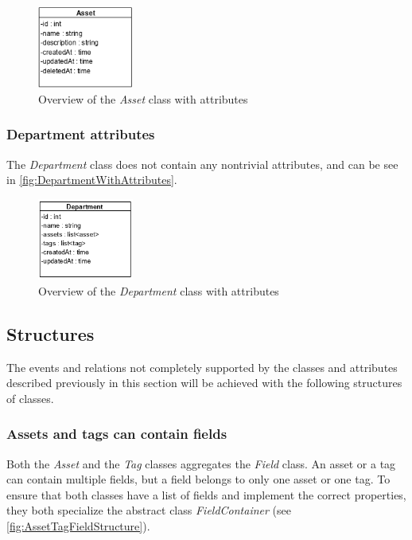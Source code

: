 \begin{figure}[H]
    \centering
    \includegraphics[width=0.28\textwidth]{figures/Classes/AssetAttributes.png}
    \caption{Overview of the \textit{Asset} class with attributes}
    \label{fig:AssetWithAttributes}
\end{figure}

\subsubsection{Department attributes}
The \textit{Department} class does not contain any nontrivial attributes, and can be see in \autoref{fig:DepartmentWithAttributes}.
\begin{figure}[H]
    \centering
    \includegraphics[width=0.28\textwidth]{figures/Classes/DepartmentAttributes.png}
    \caption{Overview of the \textit{Department} class with attributes}
    \label{fig:DepartmentWithAttributes}
\end{figure}


\subsection{Structures}
The events and relations not completely supported by the classes and attributes described previously in this section will be achieved with the following structures of classes.

\subsubsection{Assets and tags can contain fields}
Both the \textit{Asset} and the \textit{Tag} classes aggregates the \textit{Field} class. An asset or a tag can contain multiple fields, but a field belongs to only one asset or one tag. To ensure that both classes have a list of fields and implement the correct properties, they both specialize the abstract class \textit{FieldContainer} (see \autoref{fig:AssetTagFieldStructure}).


